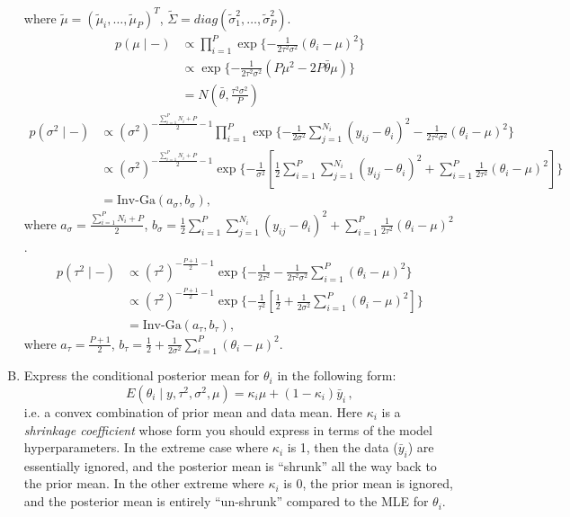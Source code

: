 \documentclass[11pt]{article}
\newcommand{\half}{\frac{1}{2}}
\begin{document}
\begin{enumerate}[(A)]
where $\tilde{\mu} = (\tilde{\mu}_i, \dots, \tilde{\mu}_P)^T$, $\tilde{\Sigma} = diag(\tilde{\sigma}_1^2, \dots, \tilde{\sigma}_P^2)$.
\begin{align*}
    p(\mu \mid -) &\propto \prod_{i=1}^P \exp\{-\frac{1}{2\tau^2 \sigma^2} (\theta_i - \mu)^2\} \\
    &\propto \exp\{-\frac{1}{2\tau^2 \sigma^2} (P \mu^2 - 2P \bar{\theta} \mu) \} \\
    &= N(\bar{\theta}, \frac{\tau^2 \sigma^2}{P} )
\end{align*}
\begin{align*}
    p(\sigma^2 \mid -) &\propto (\sigma^2)^{-\frac{\sum_{i=1}^P N_i + P}{2} - 1} \prod_{i=1}^P \exp\{ -\frac{1}{2\sigma^2} \sum_{j=1}^{N_i} (y_{ij} - \theta_i)^2 - \frac{1}{2\tau^2 \sigma^2} (\theta_i -\mu)^2 \} \\
    &\propto (\sigma^2)^{-\frac{\sum_{i=1}^P N_i + P}{2} - 1} \exp\{ -\frac{1}{\sigma^2} [\half \sum_{i=1}^P \sum_{j=1}^{N_i} (y_{ij} - \theta_i)^2 + \sum_{i=1}^P \frac{1}{2\tau^2} (\theta_i -\mu)^2] \} \\
    &= \text{Inv-Ga}(a_\sigma, b_\sigma),
\end{align*}
where $a_\sigma = \frac{\sum_{i=1}^P N_i + P}{2}$, $b_\sigma = \half \sum_{i=1}^P \sum_{j=1}^{N_i} (y_{ij} - \theta_i)^2 + \sum_{i=1}^P \frac{1}{2\tau^2} (\theta_i -\mu)^2$.
\begin{align*}
    p(\tau^2 \mid -) &\propto (\tau^2)^{-\frac{P+1}{2} - 1} \exp\{ -\frac{1}{2\tau^2} - \frac{1}{2\tau^2 \sigma^2} \sum_{i=1}^P (\theta_i -\mu)^2\} \\
    &\propto (\tau^2)^{-\frac{P+1}{2} - 1} \exp\{ -\frac{1}{\tau^2} [\half + \frac{1}{2 \sigma^2} \sum_{i=1}^P (\theta_i -\mu)^2] \} \\
    &= \text{Inv-Ga} (a_\tau, b_\tau),
\end{align*}
where $a_\tau = \frac{P+1}{2}$, $b_\tau = \half + \frac{1}{2 \sigma^2} \sum_{i=1}^P (\theta_i -\mu)^2$.



\item Express the conditional posterior mean for $\theta_i$ in the following form:
$$
E(\theta_i \mid y, \tau^2, \sigma^2, \mu) = \kappa_i \mu + (1-\kappa_i) \bar{y}_i \, ,
$$
i.e. a convex combination of prior mean and data mean.  Here $\kappa_i$ is a \textit{shrinkage coefficient} whose form you should express in terms of the model hyperparameters.  In the extreme case where $\kappa_i$ is 1, then the data ($\bar{y}_i$) are essentially ignored, and the posterior mean is ``shrunk'' all the way back to the prior mean.  In the other extreme where $\kappa_i$ is 0, the prior mean is ignored, and the posterior mean is entirely ``un-shrunk'' compared to the MLE for $\theta_i$.  


\end{enumerate}
\end{document}
